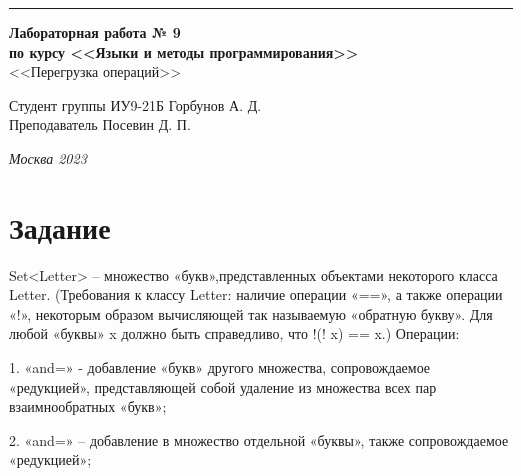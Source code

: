 \documentclass[a4paper, 14pt]{extarticle}
\begin{document}
\begin{titlepage}
\vspace*{-16pt}
\hspace{30pt}\rule{0.866\textwidth}{0.4pt}
  
\vspace{11em}

\begin{center}
\Large {\bf Лабораторная работа № 9} \\ 
\large {\bf по курсу <<Языки и методы программирования>>} \\
\large <<Перегрузка операций>> 
\end{center}\normalsize

\vspace{8em}


\begin{flushright}
  {Студент группы ИУ9-21Б Горбунов А. Д. \hspace*{15pt}\\ 
  \vspace{2ex}
  Преподаватель Посевин Д. П.\hspace*{15pt}}
\end{flushright}

\bigskip

\vfill
 

\begin{center}
\textsl{Москва 2023}
\end{center}
\end{titlepage}

\renewcommand{\ttdefault}{pcr}

\setlength{\tabcolsep}{3pt}
\newpage
\setcounter{page}{2}

\section{Задание}\label{Sect::task}
	Set<Letter> – множество «букв»,представленных объектами некоторого класса Letter. (Требования к классу Letter: наличие операции «==», а также операции «!», некоторым образом вычисляющей так называемую «обратную букву». Для любой «буквы» x должно быть справедливо, что !(! x) == x.) Операции:
 
    1. «and=» - добавление «букв» другого множества, сопровождаемое «редукцией», представляющей собой удаление из множества всех пар взаимнообратных «букв»;
    
    2. «and=» – добавление в множество отдельной «буквы», также сопровождаемое «редукцией»;
    
\end{document}
